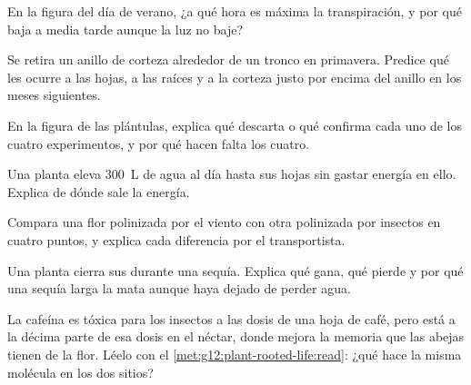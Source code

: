 \begin{exercise}[$\star\star$]\label{exo:g12:plant-rooted-life:7}
En la figura del día de verano, ¿a qué hora es máxima la
transpiración, y por qué baja a media tarde aunque la luz no baje?
\end{exercise}

\begin{exercise}[$\star\star$]\label{exo:g12:plant-rooted-life:8}
Se retira un anillo de corteza alrededor de un tronco en primavera.
Predice qué les ocurre a las hojas, a las raíces y a la corteza justo
por encima del anillo en los meses siguientes.
\end{exercise}

\begin{exercise}[$\star\star$]\label{exo:g12:plant-rooted-life:9}
En la figura de las plántulas, explica qué descarta o qué confirma cada
uno de los cuatro experimentos, y por qué hacen falta los cuatro.
\end{exercise}

\begin{exercise}[$\star\star$]\label{exo:g12:plant-rooted-life:10}
Una planta eleva \qty{300}{L} de agua al día hasta sus hojas sin
gastar energía en ello. Explica de dónde sale la energía.
\end{exercise}

\begin{exercise}[$\star\star$]\label{exo:g12:plant-rooted-life:11}
Compara una flor polinizada por el viento con otra polinizada por
insectos en cuatro puntos, y explica cada diferencia por el
transportista.
\end{exercise}

\begin{exercise}[$\star\star\star$]\label{exo:g12:plant-rooted-life:12}
Una planta cierra sus  durante una sequía. Explica qué gana, qué
pierde y por qué una sequía larga la mata aunque haya dejado de perder
agua.
\end{exercise}

\begin{exercise}[$\star\star\star$]\label{exo:g12:plant-rooted-life:13}
La cafeína es tóxica para los insectos a las dosis de una hoja de café,
pero está a la décima parte de esa dosis en el néctar, donde mejora la
memoria que las abejas tienen de la flor. Léelo con el
\cref{met:g12:plant-rooted-life:read}: ¿qué hace la misma molécula en
los dos sitios?
\end{exercise}

